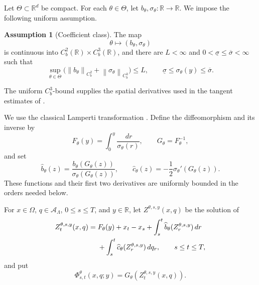 \documentclass[11pt,reqno]{amsart}
\theoremstyle{plain}
\theoremstyle{definition}
\newtheorem{assumption}[assumption]{Assumption}
\newcommand{\R}{\mathbb R}
\newcommand{\cA}{\mathcal A}
\newcommand{\dd}{\,d}
\newcommand{\norm}[1]{\left\lVert #1\right\rVert}
\begin{document}
Let \(\Theta\subset\R^d\) be compact.  For each \(\theta\in\Theta\),
let \(b_\theta,\sigma_\theta:\R\to\R\).  We impose the following uniform
assumption.

\begin{assumption}[Coefficient class]\label{ass:coefficients}
The map
\[
  \theta\longmapsto(b_\theta,\sigma_\theta)
\]
is continuous into \(C_b^2(\R)\times C_b^3(\R)\), and there are
\(L<\infty\) and \(0<\underline\sigma\le\overline\sigma<\infty\) such that
\[
  \sup_{\theta\in\Theta}
  \bigl(
    \norm{b_\theta}_{C_b^2}
    +\norm{\sigma_\theta}_{C_b^3}
  \bigr)
  \le L,
  \qquad
  \underline\sigma\le\sigma_\theta(y)\le\overline\sigma.
\]
\end{assumption}

The uniform \(C_b^3\)-bound supplies the spatial derivatives used in the
tangent estimates of .

We use the classical Lamperti transformation \cite{Lamperti64}.  Define the
diffeomorphism and its inverse by
\begin{equation}\label{eq:Lamperti-transform}
  F_\theta(y)=\int_0^y\frac{\dd r}{\sigma_\theta(r)},
  \qquad
  G_\theta=F_\theta^{-1},
\end{equation}
and set
\begin{equation}\label{eq:transformed-coefficients}
  \widehat b_\theta(z)
  =\frac{b_\theta(G_\theta(z))}{\sigma_\theta(G_\theta(z))},
  \qquad
  \widehat c_\theta(z)
  =-\frac12\sigma_\theta'(G_\theta(z)).
\end{equation}
These functions and their first two derivatives are uniformly bounded in
the orders needed below.

For \(x\in\Omega\), \(q\in\cA_\Lambda\), \(0\le s\le T\), and
\(y\in\R\), let \(Z^{\theta,s,y}(x,q)\) be the solution of
\begin{align}
  Z_t^{\theta,s,y}(x,q)
  ={}&F_\theta(y)+x_t-x_s
  +\int_s^t\widehat b_\theta(Z_r^{\theta,s,y})\dd r
  \notag\\
  &+\int_s^t\widehat c_\theta(Z_r^{\theta,s,y})\dd q_r,
  \qquad s\le t\le T,
  \label{eq:deterministic-Lamperti}
\end{align}
and put
\begin{equation}\label{eq:deterministic-flow-map}
  \Phi_{s,t}^\theta(x,q;y)
  =G_\theta(Z_t^{\theta,s,y}(x,q)).
\end{equation}
\end{document}
